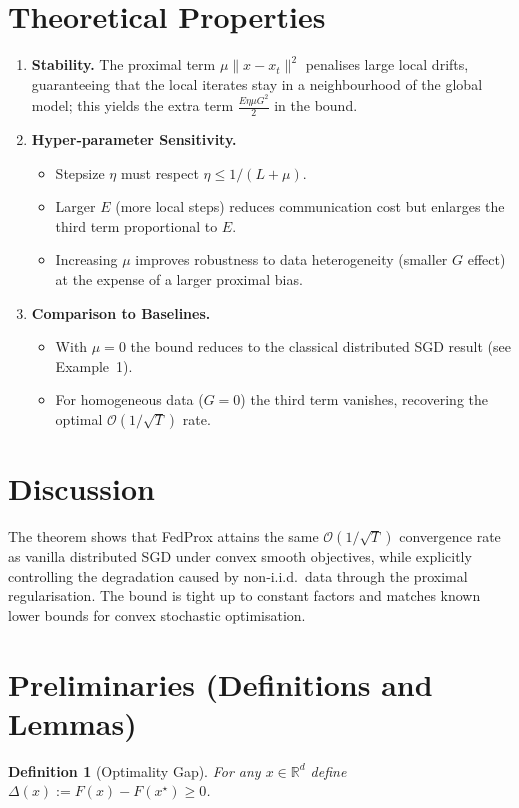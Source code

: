 \documentclass{article}
\newtheorem{definition}{Definition}
\begin{document}
\section*{Theoretical Properties}
\begin{enumerate}[label=\arabic*.]
\item \textbf{Stability.} The proximal term $\mu\|x-x_t\|^2$ penalises
large local drifts, guaranteeing that the local iterates stay in a
neighbourhood of the global model; this yields the extra term
$\frac{E\eta\mu G^2}{2}$ in the bound.
\item \textbf{Hyper‑parameter Sensitivity.}
    \begin{itemize}
        \item Stepsize $\eta$ must respect $\eta\le 1/(L+\mu)$.
        \item Larger $E$ (more local steps) reduces communication cost
              but enlarges the third term proportional to $E$.
        \item Increasing $\mu$ improves robustness to data heterogeneity
              (smaller $G$ effect) at the expense of a larger proximal bias.
    \end{itemize}
\item \textbf{Comparison to Baselines.}
    \begin{itemize}
        \item With $\mu=0$ the bound reduces to the classical
              distributed SGD result (see Example~1).
        \item For homogeneous data ($G=0$) the third term vanishes,
              recovering the optimal $\mathcal{O}(1/\sqrt{T})$ rate.
    \end{itemize}
\end{enumerate}

\section*{Discussion}
The theorem shows that FedProx attains the same $\mathcal{O}(1/\sqrt{T})$
convergence rate as vanilla distributed SGD under convex smooth
objectives, while explicitly controlling the degradation caused by
non‑i.i.d.\ data through the proximal regularisation. The bound is
tight up to constant factors and matches known lower bounds for
convex stochastic optimisation.

\newpage
\section*{Preliminaries (Definitions and Lemmas)}
\begin{definition}[Optimality Gap]
For any $x\in\mathbb{R}^d$ define $\Delta(x):=F(x)-F(x^\star)\ge0$.
\end{definition}
\end{document}
